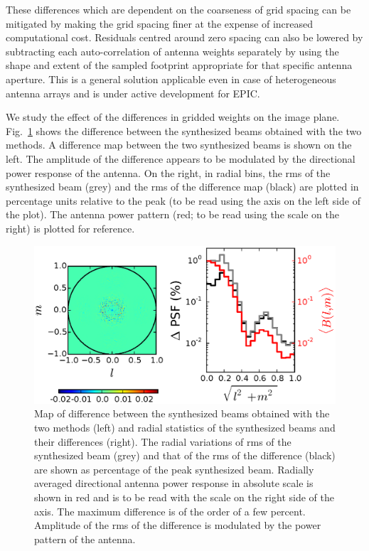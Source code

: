 \documentclass[a4paper,fleqn,usenatbib]{mnras}
\begin{document}
These differences which are dependent on the coarseness of grid spacing can be mitigated by making the grid spacing finer at the expense of increased computational cost. Residuals centred around zero spacing can also be lowered by subtracting each auto-correlation of antenna weights separately by using the shape and extent of the sampled footprint appropriate for that specific antenna aperture. This is a general solution applicable even in case of heterogeneous antenna arrays and is under active development for EPIC.

We study the effect of the differences in gridded weights on the image plane. Fig.~\ref{fig:image-psf-diff} shows the difference between the synthesized beams obtained with the two methods. A difference map between the two synthesized beams is shown on the left. The amplitude of the difference appears to be modulated by the directional power response of the antenna. On the right, in radial bins, the rms of the synthesized beam (grey) and the rms of the difference map (black) are plotted in percentage units relative to the peak (to be read using the axis on the left side of the plot). The antenna power pattern (red; to be read using the scale on the right) is plotted for reference. 

\begin{figure}
  \includegraphics[width=\columnwidth]{figure8}
  \caption{Map of difference between the synthesized beams obtained with the two methods (left) and radial statistics of the synthesized beams and their differences (right). The radial variations of rms of the synthesized beam (grey) and that of the rms of the difference (black) are shown as percentage of the peak synthesized beam. Radially averaged directional antenna power response in absolute scale is shown in red and is to be read with the scale on the right side of the axis. The maximum difference is of the order of a few percent. Amplitude of the rms of the difference is modulated by the power pattern of the antenna.}
  \label{fig:image-psf-diff}
\end{figure}
\end{document}
